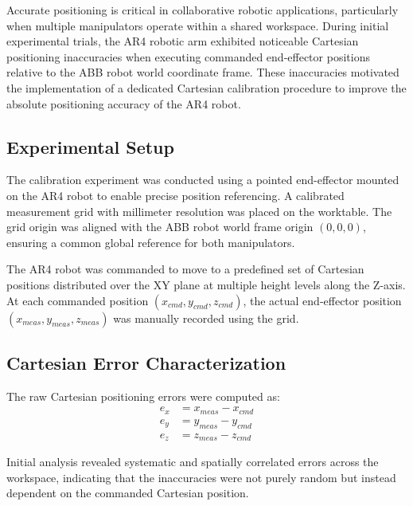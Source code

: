\thispagestyle{fancy}
\vspace*{0cm} %
\label{sec:ar4_calibration}

Accurate positioning is critical in collaborative robotic applications, particularly when multiple manipulators operate within a shared workspace. During initial experimental trials, the AR4 robotic arm exhibited noticeable Cartesian positioning inaccuracies when executing commanded end-effector positions relative to the ABB robot world coordinate frame. These inaccuracies motivated the implementation of a dedicated Cartesian calibration procedure to improve the absolute positioning accuracy of the AR4 robot.

\subsection{Experimental Setup}

The calibration experiment was conducted using a pointed end-effector mounted on the AR4 robot to enable precise position referencing. A calibrated measurement grid with millimeter resolution was placed on the worktable. The grid origin was aligned with the ABB robot world frame origin $(0,0,0)$, ensuring a common global reference for both manipulators.

The AR4 robot was commanded to move to a predefined set of Cartesian positions distributed over the XY plane at multiple height levels along the Z-axis. At each commanded position $(x_{cmd}, y_{cmd}, z_{cmd})$, the actual end-effector position $(x_{meas}, y_{meas}, z_{meas})$ was manually recorded using the grid.

\subsection{Cartesian Error Characterization}

The raw Cartesian positioning errors were computed as:
\begin{equation}
\begin{aligned}
e_x &= x_{meas} - x_{cmd} \\
e_y &= y_{meas} - y_{cmd} \\
e_z &= z_{meas} - z_{cmd}
\end{aligned}
\end{equation}

Initial analysis revealed systematic and spatially correlated errors across the workspace, indicating that the inaccuracies were not purely random but instead dependent on the commanded Cartesian position.

